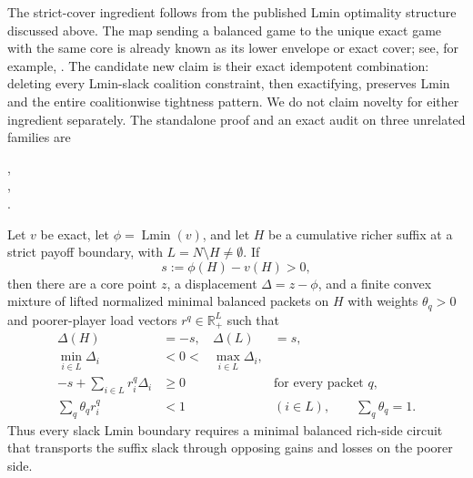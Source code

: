 The strict-cover ingredient follows from the published Lmin optimality
structure discussed above.  The map sending a balanced game to the unique
exact game with the same core is already known as its lower envelope or exact
cover; see, for example,
\citet{Schmeidler1972,StudenyKratochvil2022}.  The candidate new
claim is their exact idempotent combination: deleting every Lmin-slack
coalition constraint, then exactifying, preserves Lmin and the entire
coalitionwise tightness pattern.  We do not claim novelty for either
ingredient separately.  The standalone proof and an exact audit on three
unrelated families are
\begin{center}
\small{},\\[-2pt]
\small{},\\[-2pt]
\small{}.
\end{center}

\begin{theorem}
\label{thm:lx-balanced-trace-transport}
Let $v$ be exact, let $\phi=\operatorname{Lmin}(v)$, and let $H$ be a
cumulative richer suffix at a strict payoff boundary, with
$L=N\setminus H\ne\emptyset$.  If
\[
 s:=\phi(H)-v(H)>0,
\]
then there are a core point $z$, a displacement $\Delta=z-\phi$, and a
finite convex mixture of lifted normalized minimal balanced packets on $H$
with weights $\theta_q>0$ and poorer-player load vectors
$r^q\in\mathbb R_+^L$ such that
\begin{align}
 \Delta(H)&=-s,& \Delta(L)&=s,                         \tag{BT-1}\label{eq:lx-transport-direction}\\
 \min_{i\in L}\Delta_i&<0<&\max_{i\in L}\Delta_i,    \tag{BT-2}\label{eq:lx-transport-signs}\\
 -s+\sum_{i\in L}r_i^q\Delta_i&\geq0
     &&\text{for every packet }q,                     \tag{BT-3}\label{eq:lx-transport-packet}\\
 \sum_q\theta_q r_i^q&<1
     &&(i\in L),\qquad \sum_q\theta_q=1.             \tag{BT-4}\label{eq:lx-transport-average}
\end{align}
Thus every slack Lmin boundary requires a minimal balanced rich-side circuit
that transports the suffix slack through opposing gains and losses on the
poorer side.
\end{theorem}

